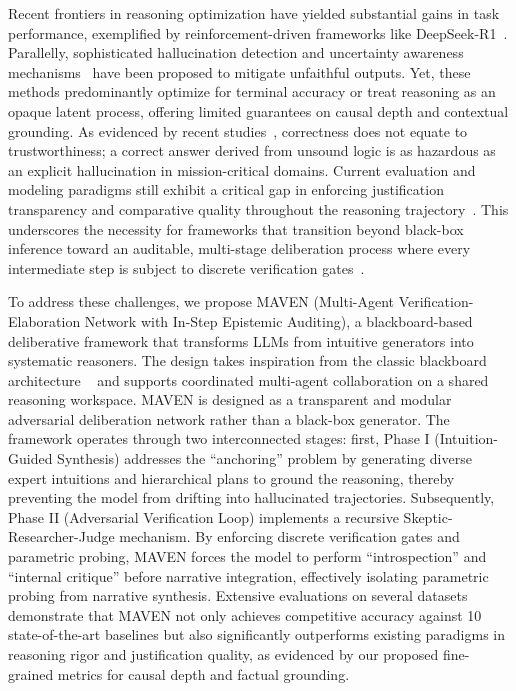 \documentclass{article}
\begin{document}
Recent frontiers in reasoning optimization have yielded substantial gains in task performance, exemplified by reinforcement-driven frameworks like DeepSeek-R1~\cite{deepseek2025r1}. Parallelly, sophisticated hallucination detection and uncertainty awareness mechanisms~\cite{ji2023survey, huang2025survey, zhao2024knowing, zhang2024rtuning, orgad2024llms, sawczyn2026factselfcheck} have been proposed to mitigate unfaithful outputs. Yet, these methods predominantly optimize for terminal accuracy or treat reasoning as an opaque latent process, offering limited guarantees on causal depth and contextual grounding. As evidenced by recent studies~\cite{kadavath2022knowledge, li2025reasoning}, correctness does not equate to trustworthiness; a correct answer derived from unsound logic is as hazardous as an explicit hallucination in mission-critical domains. Current evaluation and modeling paradigms still exhibit a critical gap in enforcing justification transparency and comparative quality throughout the reasoning trajectory~\cite{kulkarni2025evaluating, bar2025beyond}. This underscores the necessity for frameworks that transition beyond black-box inference toward an auditable, multi-stage deliberation process where every intermediate step is subject to discrete verification gates~\cite{zhang2025incentivizing}.

To address these challenges, we propose MAVEN (Multi-Agent Verification-Elaboration Network with In-Step Epistemic Auditing), a blackboard-based deliberative framework that transforms LLMs from intuitive generators into systematic reasoners. The design takes inspiration from the classic blackboard architecture ~\cite{nii1986blackboard} and supports coordinated multi-agent collaboration on a shared reasoning workspace. MAVEN is designed as a transparent and modular adversarial deliberation network rather than a black-box generator. The framework operates through two interconnected stages: first, Phase I (Intuition-Guided Synthesis) addresses the ``anchoring'' problem by generating diverse expert intuitions and hierarchical plans to ground the reasoning, thereby preventing the model from drifting into hallucinated trajectories. Subsequently, Phase II (Adversarial Verification Loop) implements a recursive Skeptic-Researcher-Judge mechanism. By enforcing discrete verification gates and parametric probing, MAVEN forces the model to perform ``introspection'' and ``internal critique'' before narrative integration, effectively isolating parametric probing from narrative synthesis. Extensive evaluations on several datasets demonstrate that MAVEN not only achieves competitive accuracy against 10 state-of-the-art baselines but also significantly outperforms existing paradigms in reasoning rigor and justification quality, as evidenced by our proposed fine-grained metrics for causal depth and factual grounding.
\end{document}
